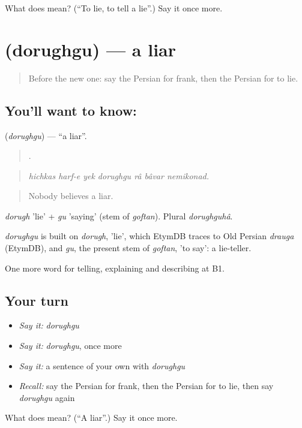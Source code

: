 \begin{tcolorbox}[breakable,colback=teal!4,colframe=teal!35!black,title={Before you move on}]
What does   mean? (\textquotedblleft{}To lie, to tell a lie\textquotedblright{}.) Say it once more.
\end{tcolorbox}
\section[\texorpdfstring{\fa{دروغگو} (dorughgu)}{دروغگو (dorughgu)}]{ (dorughgu) — a liar}

\label{lesson:FA-C483-dorughgu}



\begin{quote}
Before the new one: say the Persian for frank, then the Persian for to lie.
\end{quote}

\subsection*{You'll want to know: }
\textbf{} (\emph{dorughgu}) — \textquotedblleft{}a liar\textquotedblright{}.

\begin{quote}
      .
\end{quote}

\begin{quote}
\emph{hichkas harf-e yek dorughgu râ bâvar nemikonad.}
\end{quote}

\begin{quote}
Nobody believes a liar.
\end{quote}

\emph{dorugh} 'lie' + \emph{gu} 'saying' (stem of \emph{goftan}). Plural \emph{dorughguhâ}.

\begin{cousinweb}
\emph{dorughgu} is built on \emph{dorugh}, 'lie', which EtymDB traces to Old Persian \emph{drauga} (EtymDB), and \emph{gu}, the present stem of \emph{goftan}, 'to say': a lie-teller.
\end{cousinweb}

\begin{grammarlens}[title={What you've built}]
One more word for telling, explaining and describing at B1.
\end{grammarlens}

\subsection*{Your turn}
\begin{itemize}
\raggedright
  \item \emph{Say it:} \emph{dorughgu}
  \item \emph{Say it:} \emph{dorughgu}, once more
  \item \emph{Say it:} a sentence of your own with \emph{dorughgu}
  \item \emph{Recall:} say the Persian for frank, then the Persian for to lie, then say \emph{dorughgu} again
\end{itemize}

\begin{tcolorbox}[breakable,colback=teal!4,colframe=teal!35!black,title={Before you move on}]
What does  mean? (\textquotedblleft{}A liar\textquotedblright{}.) Say it once more.
\end{tcolorbox}
